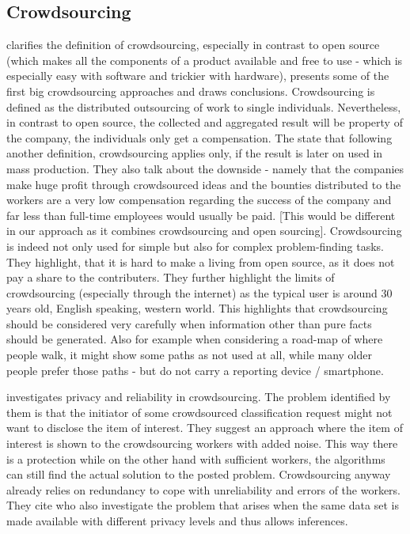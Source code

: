 \subsection{Crowdsourcing}
\parencite{brabham2008crowdsourcing} clarifies the definition of crowdsourcing, especially in contrast to open source (which makes all the components of a product available and free to use - which is especially easy with software and trickier with hardware), presents some of the first big crowdsourcing approaches and draws conclusions. Crowdsourcing is defined as the distributed outsourcing of work to single individuals. Nevertheless, in contrast to open source, the collected and aggregated result will be property of the company, the individuals only get a compensation. The state that following another definition, crowdsourcing applies only, if the result is later on used in mass production. They also talk about the downside - namely that the companies make huge profit through crowdsourced ideas and the bounties distributed to the workers are a very low compensation regarding the success of the company and far less than full-time employees would usually be paid. [This would be different in our approach as it combines crowdsourcing and open sourcing]. Crowdsourcing is indeed not only used for simple but also for complex problem-finding tasks. They highlight, that it is hard to make a living from open source, as it does not pay a share to the contributers. They further highlight the limits of crowdsourcing (especially through the internet) as the typical user is around 30 years old, English speaking, western world. This highlights that crowdsourcing should be considered very carefully when information other than pure facts should be generated. Also for example when considering a road-map of where people walk, it might show some paths as not used at all, while many older people prefer those paths - but do not carry a reporting device / smartphone.

\parencite{varshney2012privacy} investigates privacy and reliability in crowdsourcing. The problem identified by them is that the initiator of some crowdsourced classification request might not want to disclose the item of interest. They suggest an approach where the item of interest is shown to the crowdsourcing workers with added noise. This way there is a protection while on the other hand with sufficient workers, the algorithms can still find the actual solution to the posted problem. Crowdsourcing anyway already relies on redundancy to cope with unreliability and errors of the workers. They cite \parencite{xiao2009optimal} who also investigate the problem that arises when the same data set is made available with different privacy levels and thus allows inferences.

